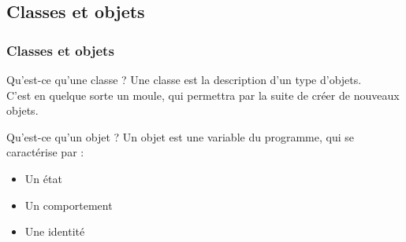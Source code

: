 \documentclass{beamer}
\begin{document}
\subsection{Classes et objets}

\begin{frame}
\frametitle{Classes et objets}
\begin{block}{Qu'est-ce qu'une classe ?}
Une classe est la description d'un type d'objets. \\ 
C'est en quelque sorte un moule, qui permettra par la suite de créer de nouveaux objets.
\end{block}
\begin{block}{Qu'est-ce qu'un objet ?}
Un objet est une variable du programme, qui se caractérise par :
\begin{itemize}
\item{Un état}
\item{Un comportement}
\item{Une identité}
\end{itemize}
\end{block}
\end{frame}
\end{document}

